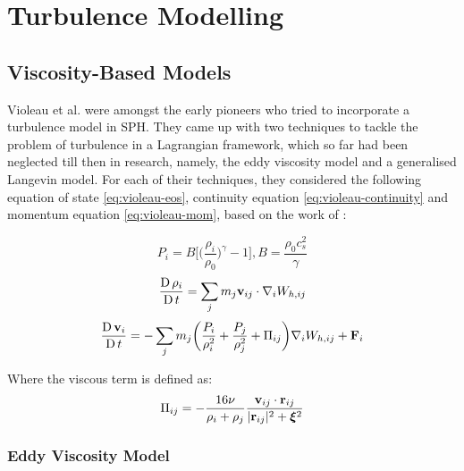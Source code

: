 \chapter{Turbulence Modelling} %
\label{Chapter2}

\section{Viscosity-Based Models}
Violeau et al. \parencite{VIOLEAU2002} were amongst the early pioneers who tried to incorporate a turbulence model in SPH. They came up with two techniques to tackle the problem of turbulence in a Lagrangian framework, which so far had been neglected till then in research, namely, the eddy viscosity model and a generalised Langevin model. For each of their techniques, they considered the following equation of state \ref{eq:violeau-eos}, continuity equation \ref{eq:violeau-continuity} and momentum equation \ref{eq:violeau-mom}, based on the work of \parencite{Monaghan1992}:

\begin{equation}
	P_i = B \Bigg[ \bigg( \frac{\rho_i}{\rho_0} \bigg)^{\gamma} - 1 \Bigg], B = \frac{\rho_0 c_s^2}{\gamma}
	\label{eq:violeau-eos}
\end{equation}
\begin{equation}
	\frac{\operatorname{D} \rho_i}{\operatorname{D} t} = \sum_j m_j \mathbf{v}_{ij} \cdot \nabla_{i} W_{h, ij}
	\label{eq:violeau-continuity}
\end{equation}
\begin{equation}
	\frac{\operatorname{D} \mathbf{v}_i}{\operatorname{D} t} = - \sum_j m_j \bigg( \frac{P_i}{\rho_i^2} + \frac{P_j}{\rho_j^2} + \Pi_{ij} \bigg) \nabla_{i} W_{h, ij} + \mathbf{F}_i
	\label{eq:violeau-mom}
\end{equation}

Where the viscous term is defined as:
\begin{equation}
	\Pi_{ij} = - \frac{16\nu}{\rho_i + \rho_j} \frac{\mathbf{v}_{ij} \cdot \mathbf{r}_{ij}}{|\mathbf{r}_{ij}|^{2} + \bm{\xi}^2} 
	\label{eq:violeau-diffusion-term}
\end{equation}

\subsection{Eddy Viscosity Model}
\label{sec:eddy-visc-model}

